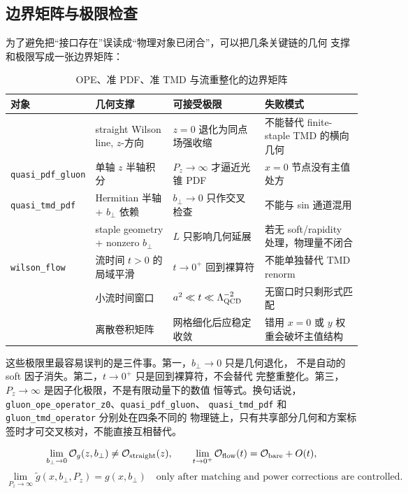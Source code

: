\documentclass[UTF8,11pt,oneside]{ctexbook}
\begin{document}
\subsection{边界矩阵与极限检查}
为了避免把“接口存在”误读成“物理对象已闭合”，可以把几条关键链的几何
支撑和极限写成一张边界矩阵：
\begin{table}[htbp]
\centering
\caption{OPE、准 PDF、准 TMD 与流重整化的边界矩阵}
\small
\begin{tabularx}{0.96\textwidth}{@{}P{3.0cm}P{4.2cm}P{3.3cm}Y@{}}
\toprule
对象 & 几何支撑 & 可接受极限 & 失败模式\\
\midrule
{} & straight Wilson line, \(z\)-方向 & \(z=0\) 退化为同点场强收缩 & 不能替代 finite-staple TMD 的横向几何\\
\texttt{quasi\_pdf\_gluon} & 单轴 \(z\) 半轴积分 & \(P_z\to\infty\) 才逼近光锥 PDF & \(x=0\) 节点没有主值处方\\
\texttt{quasi\_tmd\_pdf} & Hermitian 半轴 + \(b_\perp\) 依赖 & \(b_\perp\to0\) 只作交叉检查 & 不能与 sin 通道混用\\
 & staple geometry + nonzero \(b_\perp\) & \(L\) 只影响几何延展 & 若无 soft/rapidity 处理，物理量不闭合\\
\texttt{wilson\_flow} & 流时间 \(t>0\) 的局域平滑 & \(t\to0^+\) 回到裸算符 & 不能单独替代 TMD renorm\\
 & 小流时间窗口 & \(a^2\ll t\ll\Lambda_{\rm QCD}^{-2}\) & 无窗口时只剩形式匹配\\
 & 离散卷积矩阵 & 网格细化后应稳定收敛 & 错用 \(x=0\) 或 \(y\) 权重会破坏主值结构\\
\bottomrule
\end{tabularx}
\end{table}

这些极限里最容易误判的是三件事。第一，\(b_\perp\to0\) 只是几何退化，
不是自动的 soft 因子消失。第二，\(t\to0^+\) 只是回到裸算符，不会替代
完整重整化。第三，\(P_z\to\infty\) 是因子化极限，不是有限动量下的数值
恒等式。换句话说，\texttt{gluon\_ope\_operator\_z0}、\texttt{quasi\_pdf\_gluon}、
\texttt{quasi\_tmd\_pdf} 和 \texttt{gluon\_tmd\_operator} 分别处在四条不同的
物理链上，只有共享部分几何和方案标签时才可交叉核对，不能直接互相替代。

\begin{equation}
 \lim_{b_\perp\to0}\mathcal O_g(z,b_\perp)\neq \mathcal O_{\rm straight}(z),
 \qquad
 \lim_{t\to0^+}\mathcal O_{\rm flow}(t)=\mathcal O_{\rm bare}+O(t),
\end{equation}
\begin{equation}
 \lim_{P_z\to\infty}\widetilde g(x,b_\perp,P_z)=g(x,b_\perp)
 \quad\text{only after matching and power corrections are controlled}.
\end{equation}
\end{document}
